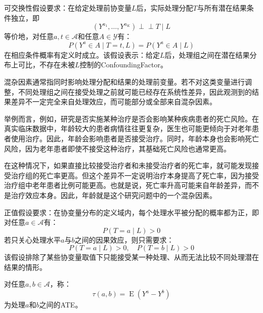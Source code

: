 \begin{definition}[可交换性假设]
	可交换性假设要求：在给定处理前协变量$L$后，实际处理分配$T$与所有潜在结果条件独立，即
	\begin{equation*}
		(Y^{a_1},\ldots,Y^{a_K})\perp\!\!\!\perp T\mid L
	\end{equation*}
	等价地，对任意$a,t\in\mathcal{A}$和任意$A\in\mathscr{Y}$有：
	\begin{equation*}
		P(Y^a\in A\mid T=t,L)=P(Y^a\in A\mid L)
	\end{equation*}
	在相应条件概率有定义时成立。该假设表示：给定$L$后，处理组之间在潜在结果分布上可比，不存在未被$L$控制的\gls{ConfoundingFactor}。
\end{definition}
\begin{note}
	混杂因素通常指同时影响处理分配和结果的处理前变量。若不对这类变量进行调整，不同处理组之间在接受处理之前就可能已经存在系统性差异，因此观测到的结果差异不一定完全来自处理效应，而可能部分或全部来自混杂因素。\par
	举例而言，例如，研究是否实施某种治疗是否会影响某种疾病患者的死亡风险。在真实临床数据中，年龄较大的患者病情往往更复杂，医生也可能更倾向于对老年患者使用治疗。因此，年龄会影响患者是否接受治疗。同时，年龄本身也会影响死亡风险，因为老年患者即使不接受这种治疗，其基础死亡风险也通常更高。\par
	在这种情况下，如果直接比较接受治疗者和未接受治疗者的死亡率，就可能发现接受治疗组的死亡率更高。但这个差异不一定说明治疗本身提高了死亡率，因为接受治疗组中老年患者比例可能更高。也就是说，死亡率升高可能来自年龄差异，而不是治疗效应本身。因此，年龄就是这个研究问题中的一个混杂因素。
\end{note}
\begin{definition}[正值假设]
	正值假设要求：在协变量分布的定义域内，每个处理水平被分配的概率都为正，即对任意$a\in\mathcal{A}$有：
	\begin{equation*}
		P(T=a\mid L)>0
	\end{equation*}
	若只关心处理水平$a$与$b$之间的因果效应，则只需要求：
	\begin{equation*}
		P(T=a\mid L)>0,\quad P(T=b\mid L)>0
	\end{equation*}
	该假设排除了某些协变量取值下只能接受某一种处理、从而无法比较不同处理潜在结果的情形。
\end{definition}
\begin{definition}
	对任意$a,b\in\mathcal{A}$，称：
	\begin{equation*}
		\tau(a,b)=\operatorname{E}(Y^a-Y^b)
	\end{equation*}
	为处理$a$和$b$之间的\gls{ATE}。
\end{definition}
